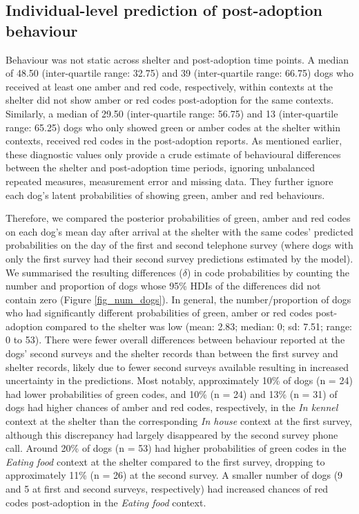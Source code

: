 \documentclass[12pt]{article}
\begin{document}
\subsection{Individual-level prediction of post-adoption behaviour}
Behaviour was not static across shelter and post-adoption time points. A median of 48.50 (inter-quartile range: 32.75) and 39 (inter-quartile range: 66.75) dogs who received at least one amber and red code, respectively, within contexts at the shelter did not show amber or red codes post-adoption for the same contexts. Similarly, a median of 29.50 (inter-quartile range: 56.75) and 13 (inter-quartile range: 65.25) dogs who only showed green or amber codes at the shelter within contexts, received red codes in the post-adoption reports. As mentioned earlier, these diagnostic values only provide a crude estimate of behavioural differences between the shelter and post-adoption time periods, ignoring unbalanced repeated measures, measurement error and missing data. They further ignore each dog's latent probabilities of showing green, amber and red behaviours.

Therefore, we compared the posterior probabilities of green, amber and red codes on each dog's mean day after arrival at the shelter with the same codes' predicted probabilities on the day of the first and second telephone survey (where dogs with only the first survey had their second survey predictions estimated by the model). We summarised the resulting differences ($\delta$) in code probabilities by counting the number and proportion of dogs whose 95\% HDIs of the differences did not contain zero (Figure \ref{fig_num_dogs}). In general, the number/proportion of dogs who had significantly different probabilities of green, amber or red codes post-adoption compared to the shelter was low (mean: 2.83; median: 0; sd: 7.51; range: 0 to 53). There were fewer overall differences between behaviour reported at the dogs' second surveys and the shelter records than between the first survey and shelter records, likely due to fewer second surveys available resulting in increased uncertainty in the predictions. Most notably, approximately 10\% of dogs (n = 24) had lower probabilities of green codes, and 10\% (n = 24) and 13\% (n = 31) of dogs had higher chances of amber and red codes, respectively, in the \textit{In kennel} context at the shelter than the corresponding \textit{In house} context at the first survey, although this discrepancy had largely disappeared by the second survey phone call. Around 20\% of dogs (n = 53) had higher probabilities of green codes in the \textit{Eating food} context at the shelter compared to the first survey, dropping to approximately 11\% (n = 26) at the second survey. A smaller number of dogs (9 and 5 at first and second surveys, respectively) had increased chances of red codes post-adoption in the \textit{Eating food} context.
\end{document}

